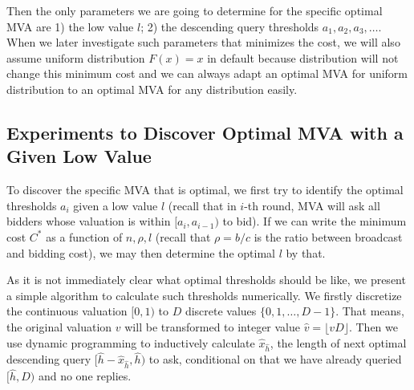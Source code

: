Then the only parameters we are going to determine for the
specific optimal MVA are 1) the low value $l$; 2) the descending query
thresholds $a_1, a_2, a_3, \ldots$.
When we later investigate such parameters that minimizes the cost, we will
also assume uniform distribution $F(x) = x$ in default because distribution will not
change this minimum cost and we can always adapt an optimal MVA for uniform distribution
to an optimal MVA for any distribution easily.

\subsection{Experiments to Discover Optimal MVA with a Given Low Value}

To discover the specific MVA that is optimal, we first try to identify the
optimal thresholds $a_i$ given a low value $l$  (recall that in $i$-th round,
MVA will ask all bidders whose valuation is within $[a_i, a_{i-1})$ to bid).
If we can write the minimum cost $C^*$ as a function of $n, \rho, l$ (recall
that $\rho = b/c$ is the ratio between broadcast and bidding cost), we may then
determine the optimal $l$ by that.


As it is not immediately clear what optimal thresholds should be like, we
present a simple algorithm to calculate such thresholds numerically. We firstly
discretize the continuous valuation $[0, 1)$ to $D$ discrete values $\{0, 1, \ldots,
D-1\}$. That means, the original valuation $v$ will be transformed to integer
value $\hat v = \lfloor v D \rfloor$. Then we use dynamic programming to
inductively calculate $\hat x_{\hat h}$, the length of next optimal descending
query $[\hat h-\hat x_{\hat h}, \hat h)$ to ask, conditional on that we have
already queried $[\hat h, D)$ and no one replies.

